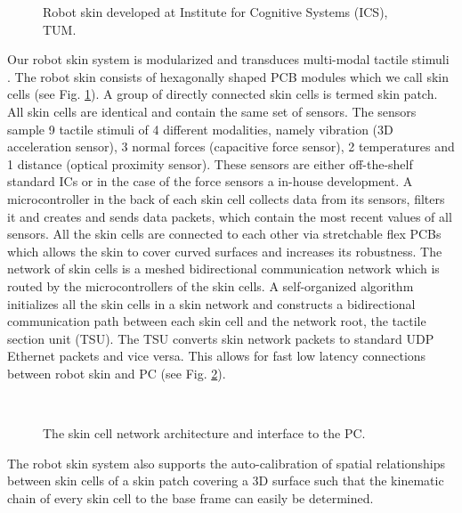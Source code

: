 \begin{figure}[h]
\centering
{}
\caption[]{Robot skin developed at Institute for Cognitive Systems (ICS), TUM.}
\label{fig:RobotSkin}
\vspace{-10pt}
\end{figure}	

Our robot skin system is modularized and transduces multi-modal tactile stimuli \cite{MittendorferYC15}. 
The robot skin consists of hexagonally shaped PCB modules which we call skin cells (see Fig. \ref{fig:RobotSkin}). 
A group of directly connected skin cells is termed skin patch. All skin cells are identical and contain the same set of sensors.
The sensors sample 9 tactile stimuli of 4 different
modalities, namely vibration (3D acceleration sensor), 3 normal forces (capacitive force sensor), 2 temperatures and 1 distance
(optical proximity sensor). These sensors are either off-the-shelf standard ICs or in the case of the force sensors a in-house development.
A microcontroller in the back of each skin cell collects data from its sensors, filters it and creates and sends data packets,
which contain the most recent values of all sensors. All the skin cells are connected to each other via stretchable flex PCBs 
which allows the skin to cover curved surfaces and increases its robustness. The network of skin cells is a meshed bidirectional
communication network which is routed by the microcontrollers of the skin cells. A self-organized algorithm initializes all 
the skin cells in a skin network and constructs a bidirectional communication path between each skin cell and the network root, 
the tactile section unit (TSU). The TSU converts skin network packets to standard UDP Ethernet packets and vice versa.
This allows for fast low latency connections between robot skin and PC (see Fig. \ref{fig:SkinCellNetworkArchitecture}).
\begin{figure}[t]
\centering
{}\\[-15pt]
\caption[]{The skin cell network architecture and interface to the PC.}
\label{fig:SkinCellNetworkArchitecture}
\vspace{-10pt}
\end{figure}

The robot skin system also supports the auto-calibration of spatial relationships between skin cells of a skin patch covering a 3D 
surface \cite{Mittendorfer-IROS12tendorfer} such that the kinematic chain of every skin cell to the base frame can easily be determined.  

